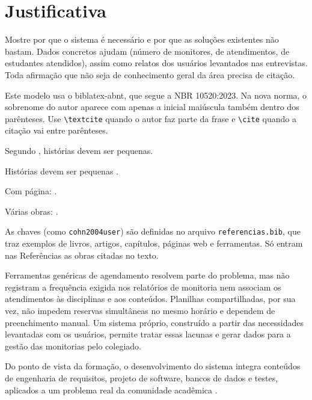 \section{Justificativa}
\label{sec:introducao:justificativa}

\begin{instrucao}
Mostre por que o sistema é necessário e por que as soluções existentes não
bastam. Dados concretos ajudam (número de monitores, de atendimentos, de
estudantes atendidos), assim como relatos dos usuários levantados nas
entrevistas. Toda afirmação que não seja de conhecimento geral da área precisa
de citação.

Este modelo usa o biblatex-abnt, que segue a NBR 10520:2023. Na nova norma, o
sobrenome do autor aparece com apenas a inicial maiúscula também dentro dos
parênteses. Use \verb|\textcite| quando o autor faz parte da frase e
\verb|\cite| quando a citação vai entre parênteses.
\begin{exemplo}
Segundo \textcite{cohn2004user},
histórias devem ser pequenas.

Histórias devem ser pequenas
\cite{cohn2004user}.

Com página:
\cite[p.~23]{cohn2004user}.

Várias obras:
\cite{sommerville2018engenharia,
pressman2021engenharia}.
\end{exemplo}
As chaves (como \verb|cohn2004user|) são definidas no arquivo
\verb|referencias.bib|, que traz exemplos de livros, artigos, capítulos,
páginas web e ferramentas. Só entram nas Referências as obras citadas no texto.
\end{instrucao}

Ferramentas genéricas de agendamento resolvem parte do problema, mas não
registram a frequência exigida nos relatórios de monitoria nem associam os
atendimentos às disciplinas e aos conteúdos. Planilhas compartilhadas, por sua
vez, não impedem reservas simultâneas no mesmo horário e dependem de
preenchimento manual. Um sistema próprio, construído a partir das necessidades
levantadas com os usuários, permite tratar essas lacunas e gerar dados para a
gestão das monitorias pelo colegiado.

Do ponto de vista da formação, o desenvolvimento do sistema integra conteúdos
de engenharia de requisitos, projeto de software, bancos de dados e testes,
aplicados a um problema real da comunidade acadêmica
\cite{sommerville2018engenharia}.

